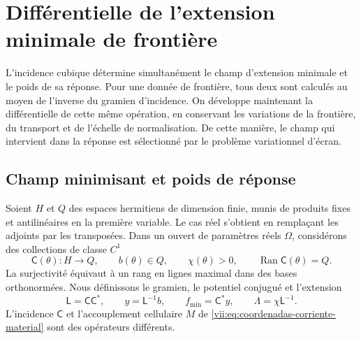 
\section{Différentielle de l'extension minimale de frontière}
\label{vii:sec:corriente-extension-minima}

L'incidence cubique détermine simultanément le champ d'extension
minimale et le poids de sa réponse. Pour une donnée de frontière, tous deux sont
calculés au moyen de l'inverse du gramien d'incidence. On développe
maintenant la différentielle de cette même opération, en conservant les variations
de la frontière, du transport et de l'échelle de normalisation. De cette
manière, le champ qui intervient dans la réponse est sélectionné par
le problème variationnel d'écran.

\subsection{Champ minimisant et poids de réponse}
\label{vii:subsec:extension-minima-parametrizada}

Soient \(H\) et \(Q\) des espaces hermitiens de dimension finie, munis de produits fixes et antilinéaires en la première variable. Le cas réel s'obtient en remplaçant les adjoints par les transposées. Dans un ouvert de paramètres réels \(\Omega\), considérons des collections de classe \(C^1\)
\[
 \mathsf C(\theta):H\longrightarrow Q,\qquad
 b(\theta)\in Q,\qquad \chi(\theta)>0,
 \qquad \operatorname{Ran}\mathsf C(\theta)=Q.
\]
La surjectivité équivaut à un rang en lignes maximal dans des bases orthonormées. Nous définissons le gramien, le potentiel conjugué et l'extension
\begin{equation}
 \mathsf L=\mathsf C\mathsf C^*,\qquad
 y=\mathsf L^{-1}b,\qquad f_{\min}=\mathsf C^*y,
 \qquad \Lambda=\chi\mathsf L^{-1}.
 \label{vii:eq:gramiano-extension-minima}
\end{equation}
L'incidence \(\mathsf C\) et l'accouplement cellulaire \(M\) de \eqref{vii:eq:coordenadas-corriente-material} sont des opérateurs différents.

